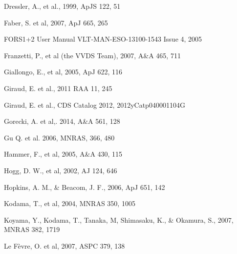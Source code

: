 \documentclass[referee]{aa}
\begin{document}
\begin{thebibliography}{}
 Dressler, A., et al., 1999, ApJS 122, 51

 Faber, S. et al, 2007, ApJ 665, 265

 FORS1+2 User Manual VLT-MAN-ESO-13100-1543 Issue 4, 2005

 Franzetti, P., et al (the VVDS Team), 2007, A\&A 465, 711




 Giallongo, E., et al, 2005, ApJ 622, 116





 Giraud, E. et al., 2011 RAA 11, 245

 Giraud, E. et al.,  CDS Catalog 2012, 2012yCatp040001104G

 Gorecki, A. et al,. 2014,  A\&A 561, 128	

 Gu Q. et al.  2006, MNRAS, 366, 480
 

 Hammer, F., et al, 2005, A\&A 430, 115



 Hogg, D. W., et al, 2002, AJ 124, 646


 Hopkins, A. M., \& Beacom, J. F., 2006, ApJ 651, 142


 Kodama, T., et al, 2004, MNRAS 350, 1005

 Koyama, Y., Kodama, T., Tanaka, M, Shimasaku, K., \& Okamura, S., 2007, MNRAS 382, 1719
 
 Le F\`evre, O. et al, 2007, ASPC 379, 138


\end{thebibliography}
\end{document}
